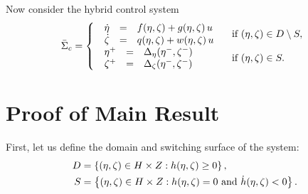 \documentclass[twocolumn]{article}
\begin{document}
Now consider the hybrid control system
\begin{align}
  \label{eq:hcsys}
        {\bar \Sigma}_{c} = \left\{
        \begin{array}{l l}
          \begin{array}{r c l}
            {\dot \eta} &=& f(\eta, \zeta) + g(\eta, \zeta) \, u\\
            {\dot \zeta} &=& q(\eta, \zeta) + w(\eta, \zeta) \, u
          \end{array} & \mbox{ if } (\eta, \zeta) \in D \setminus S,\\
          \begin{array}{r c l}
            \eta^{+} &=& \Delta_{\eta}(\eta^{-}, \zeta^{-})\\
            \zeta^{+} &=& \Delta_{\zeta}(\eta^{-}, \zeta^{-})
          \end{array} & \mbox{ if } (\eta, \zeta) \in S.
        \end{array}\right.
\end{align}

\section{Proof of Main Result}

First, let us define the domain and switching surface of the system:
\begin{align}
  D &= \left\{ (\eta, \zeta) \in H \times Z : h(\eta, \zeta) \geq 0 \right\},\\
  \nonumber
  S &= \left\{ (\eta, \zeta) \in H \times Z : h(\eta, \zeta) = 0 \mbox{ and } {\dot h}(\eta, \zeta) < 0 \right\}.
\end{align}
\end{document}
